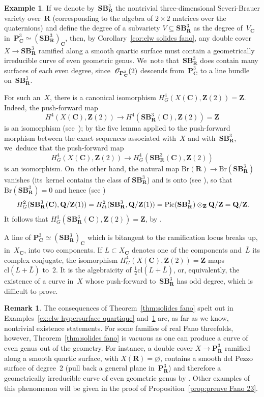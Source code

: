 \documentclass[JEP,XML,SOM,Unicode]{cedram}
\theoremstyle{plain}
\theoremstyle{definition}
\newtheorem{rmk}[thm]{Remark}
\newtheorem{example}[thm]{Example}
\numberwithin{equation}{section}
\newcommand{\cl}{{\mathrm{cl}}}
\newcommand{\sO}{{\mathscr O}}
\renewcommand{\C}{{\mathbf C}}
\renewcommand{\P}{{\mathbf P}}
\newcommand{\Q}{{\mathbf Q}}
\newcommand{\R}{{\mathbf R}}
\newcommand{\SB}{{\mathbf{SB}}}
\newcommand{\Z}{{\mathbf Z}}
\newcommand{\Pic}{\mathrm{Pic}}
\newcommand{\Br}{\mathrm{Br}}
\renewcommand{\emptyset}{\varnothing}
\newcommand{\et}{\text{ét}}
\begin{document}
\begin{example}
\label{ex:revetement double SB3}
If we denote by~$\SB^3_\R$ the nontrivial three-dimensional Severi-Brauer variety over~$\R$
(corresponding to the algebra of $2\times 2$ matrices over the quaternions)
and define the degree of
a subvariety $V \subseteq\SB^3_\R$
as the degree of~$V_\C$ in~$\P^3_\C\simeq (\SB^3_\R)_\C$,
then,
by Corollary~\ref{cor:elw solides fano},
any double cover $X\to \SB^3_\R$ ramified along a smooth quartic surface
must contain a geometrically irreducible curve of even geometric genus.
We~note that~$\SB^3_\R$ does contain many surfaces of each even degree,
since~$\smash[b]{\sO_{\P^3_\C}(2)}$
descends
from~$\P^3_\C$ to a line bundle on~$\SB^3_\R$.

For such an~$X$, there is a canonical isomorphism $H^4_G(X(\C),\Z(2))=\Z$.
Indeed, the push-forward map
\[
H^4(X(\C),\Z(2)) \to H^4(\SB^3_\R(\C),\Z(2))=\Z
\]
is an isomorphism
(see~\cite[Lem.\,1.23]{clemensdoublesolids});
by the five lemma applied to the push-forward morphism
between the exact sequences \cite[(\ref*{BW1-eq:conoyau de la norme})]{BW1} associated with~$X$
and with~$\SB^3_\R$, we~deduce that the push-forward map
\[
H^4_G(X(\C),\Z(2)) \to H^4_G(\SB^3_\R(\C),\Z(2))
\]
is an isomorphism.
On~the other hand,
the natural map $\Br(\R) \to \Br(\SB^3_\R)$ vanishes
(its~kernel contains the class of $\SB^3_\R$)
and is onto (see \cite[Prop.\,2.1.4\,(iv)]{ctsd94}), so that $\Br(\SB^3_\R)=0$ and hence (see \cite[II, Théorème~3.1]{grothbrauer})
\[
H^2_G(\SB^3_\R(\C),\Q/\Z(1))=H^2_\et(\SB^3_\R,\Q/\Z(1))=\Pic(\SB^3_\R)\otimes_\Z \Q/\Z=\Q/\Z\rlap{\text{.}}
\]
It follows that $H^4_G(\SB^3_\R(\C),\Z(2))=\Z$, by
\cite[Prop.\,\ref*{BW1-prop:poincare duality equivariant}, Rem.\,\ref*{BW1-rks:equivariant poincare}\,(ii)]{BW1}.

A line of $\P^3_\C \simeq (\SB^3_\R)_\C$ which is bitangent to the ramification locus
breaks up, in~$X_\C$, into two components.
If $L \subset X_\C$ denotes one of the components
and~$\bar L$ its complex conjugate,
the isomorphism
$H^4_G(X(\C),\Z(2))=\Z$
maps $\cl(L+\bar L)$ to~$2$.
It is the algebraicity of $\frac{1}{2}\cl(L+\bar L)$,
or, equivalently, the existence of a curve in~$X$ whose push-forward to~$\SB^3_\R$
has odd degree,
which is difficult to prove.
\end{example}

\begin{rmk}
The consequences of Theorem~\ref{thm:solides fano}
spelt out in
Examples~\ref{ex:elw hypersurface quartique}
and~\ref{ex:revetement double SB3}
are, as far as we know, nontrivial existence statements.
For some families of real Fano threefolds, however,
Theorem~\ref{thm:solides fano} is vacuous
as
one can produce a curve of even genus out of the geometry.
For instance,
a double cover $X\to\P^3_\R$ ramified along a smooth quartic surface,
with $X(\R)=\emptyset$,
contains a smooth del Pezzo surface of degree~$2$ (pull
back a general plane in~$\P^3_\R$)
and therefore a geometrically irreducible curve of even geometric genus
by \cite[Cor.\,\ref*{BW1-cor:surfaces}\,(ii)]{BW1}.
Other examples of this phenomenon will be given in the proof of Proposition~\ref{prop:preuve Fano 23}.
\end{rmk}
\end{document}
